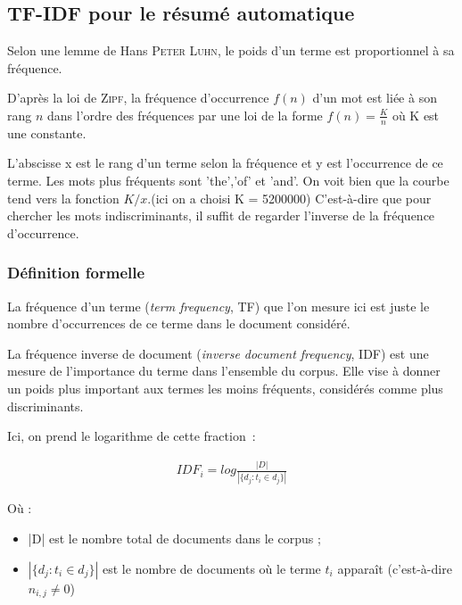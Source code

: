 \documentclass[a4paper, 12pt]{article}
\begin{document}
\subsection{TF-IDF pour le résumé automatique}
Selon une lemme de Hans \textsc{Peter Luhn}, le poids d'un terme est proportionnel à sa fréquence.

D'après la loi de \textsc{Zipf}, la fréquence d'occurrence $f(n)$ d'un mot est liée à son rang $n$ dans l'ordre des fréquences par une loi de la forme $f(n) = \frac{K}{n} $ où K est une constante.


L'abscisse x est le rang d'un terme selon la fréquence et y est l'occurrence de ce terme. Les mots plus fréquents sont 'the','of' et 'and'. On voit bien que la courbe tend vers la fonction $K/x$.(ici on a choisi K = 5200000) C'est-à-dire que pour chercher les mots indiscriminants, il suffit de regarder l'inverse de la fréquence d'occurrence.

\subsubsection{Définition formelle}

\begin{definition}[TF]
 La fréquence d'un terme (\textit{term frequency}, TF) que l'on mesure ici est juste le nombre d'occurrences de ce terme dans le document considéré.
\end{definition}

\begin{definition}[IDF]
 La fréquence inverse de document (\textit{inverse document frequency}, IDF) est une mesure de l'importance du terme dans l'ensemble du corpus. Elle vise à donner un poids plus important aux termes les moins fréquents, considérés comme plus discriminants.
\end{definition}

Ici, on prend le logarithme de cette fraction~:

\begin{align}
 IDF_{i} =  log \frac{|D|}{|\{d_{j}: t_{i} \in d_{j}\}|}
\end{align}

Où : 
\begin{itemize}
 \item |D| est le nombre total de documents dans le corpus ;
 \item $|\{d_{j} : t_{i} \in d_{j}\}|$ est le nombre de documents où le terme  $t_{i}$  apparaît (c'est-à-dire  $n_{i,j} \neq 0$)
\end{itemize}
\end{document}
